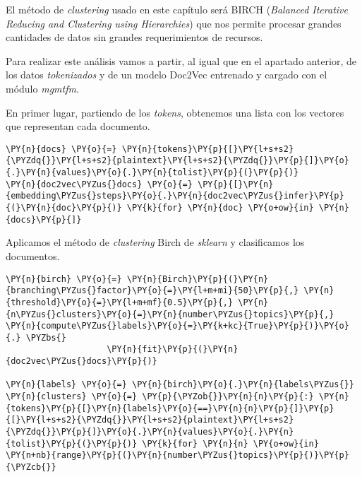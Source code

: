 El método de \textit{clustering} usado en este capítulo será  BIRCH (\textit{Balanced Iterative Reducing and Clustering using Hierarchies}) \cite{birch} que nos permite procesar grandes cantidades de datos sin grandes requerimientos de recursos.

Para realizar este análisis vamos a partir, al igual que en el apartado anterior, de los datos \textit{tokenizados} y de un modelo Doc2Vec entrenado y cargado con el módulo \textit{mgmtfm}.


    En primer lugar, partiendo de los \textit{tokens}, obtenemos una lista con los vectores que representan cada documento.
\vspace{0.5cm}
    \begin{tcolorbox}[breakable, size=fbox, boxrule=1pt, pad at break*=1mm,colback=cellbackground, colframe=cellborder]
\begin{Verbatim}[commandchars=\\\{\}]
\PY{n}{docs} \PY{o}{=} \PY{n}{tokens}\PY{p}{[}\PY{l+s+s2}{\PYZdq{}}\PY{l+s+s2}{plaintext}\PY{l+s+s2}{\PYZdq{}}\PY{p}{]}\PY{o}{.}\PY{n}{values}\PY{o}{.}\PY{n}{tolist}\PY{p}{(}\PY{p}{)}
\PY{n}{doc2vec\PYZus{}docs} \PY{o}{=} \PY{p}{[}\PY{n}{embedding\PYZus{}steps}\PY{o}{.}\PY{n}{doc2vec\PYZus{}infer}\PY{p}{(}\PY{n}{doc}\PY{p}{)} \PY{k}{for} \PY{n}{doc} \PY{o+ow}{in} \PY{n}{docs}\PY{p}{]}
\end{Verbatim}
\end{tcolorbox}

    Aplicamos el método de \textit{clustering} Birch de \textit{sklearn} y clasificamos los documentos.
\vspace{0.5cm}
    \begin{tcolorbox}[breakable, size=fbox, boxrule=1pt, pad at break*=1mm,colback=cellbackground, colframe=cellborder]
\begin{Verbatim}[commandchars=\\\{\}]
\PY{n}{birch} \PY{o}{=} \PY{n}{Birch}\PY{p}{(}\PY{n}{branching\PYZus{}factor}\PY{o}{=}\PY{l+m+mi}{50}\PY{p}{,} \PY{n}{threshold}\PY{o}{=}\PY{l+m+mf}{0.5}\PY{p}{,} \PY{n}{n\PYZus{}clusters}\PY{o}{=}\PY{n}{number\PYZus{}topics}\PY{p}{,} \PY{n}{compute\PYZus{}labels}\PY{o}{=}\PY{k+kc}{True}\PY{p}{)}\PY{o}{.} \PYZbs{}
                    \PY{n}{fit}\PY{p}{(}\PY{n}{doc2vec\PYZus{}docs}\PY{p}{)}

\PY{n}{labels} \PY{o}{=} \PY{n}{birch}\PY{o}{.}\PY{n}{labels\PYZus{}}
\PY{n}{clusters} \PY{o}{=} \PY{p}{\PYZob{}}\PY{n}{n}\PY{p}{:} \PY{n}{tokens}\PY{p}{[}\PY{n}{labels}\PY{o}{==}\PY{n}{n}\PY{p}{]}\PY{p}{[}\PY{l+s+s2}{\PYZdq{}}\PY{l+s+s2}{plaintext}\PY{l+s+s2}{\PYZdq{}}\PY{p}{]}\PY{o}{.}\PY{n}{values}\PY{o}{.}\PY{n}{tolist}\PY{p}{(}\PY{p}{)} \PY{k}{for} \PY{n}{n} \PY{o+ow}{in} \PY{n+nb}{range}\PY{p}{(}\PY{n}{number\PYZus{}topics}\PY{p}{)}\PY{p}{\PYZcb{}}
\end{Verbatim}
\end{tcolorbox}

